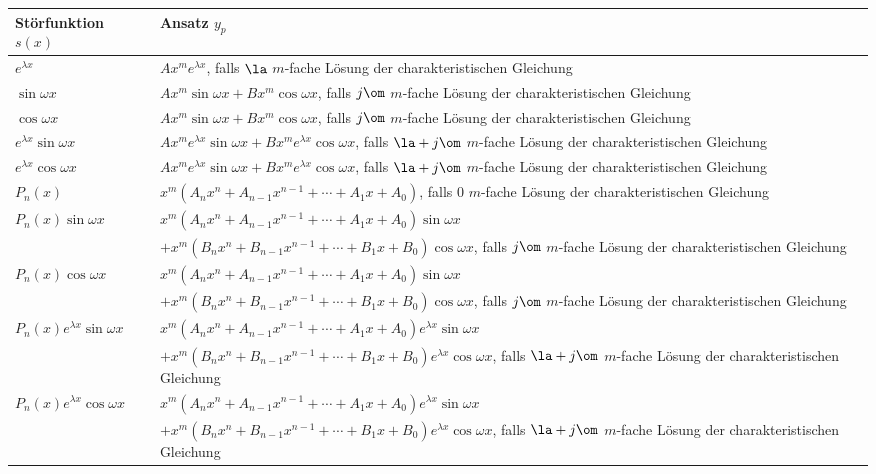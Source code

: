 

\def\arraystretch{1.5}
\noindent
\begin{longtable}{@{}p{}|p{}}
\hline
Störfunktion $s(x)$ & Ansatz $y_p$ \\
\hline
$e^{\lambda x}$ & 
$Ax^me^{\lambda x}$, falls $\la$ $m$-fache Lösung der charakteristischen 
Gleichung \\
$\sin \omega x$ & $Ax^m\sin \omega x+Bx^m\cos\omega x$, falls $j\om$ $m$-fache 
Lösung der charakteristischen Gleichung \\
$\cos \omega x$ & $Ax^m\sin \omega x+Bx^m\cos\omega x$, falls $j\om$ $m$-fache 
Lösung der charakteristischen Gleichung \\
$e^{\lambda x}\sin \omega x$ & $Ax^me^{\lambda x}\sin \omega 
x+Bx^me^{\lambda x}\cos\omega x$, falls $\la+j\om$ $m$-fache Lösung der 
charakteristischen Gleichung \\
$e^{\lambda x}\cos \omega x$ & $Ax^me^{\lambda x}\sin \omega 
x+Bx^me^{\lambda x}\cos\omega x$, falls $\la+j\om$ $m$-fache Lösung der 
charakteristischen Gleichung \\
$P_n(x)$ & $x^m(A_n x^{n}+A_{n-1} x^{n-1}+\cdots+A_1 x+A_0)$, 
falls $0$ $m$-fache Lösung der charakteristischen Gleichung \\
$P_n(x)\sin \omega x$ 
& $x^m(A_n x^n+A_{n-1} x^{n-1}+\cdots+A_1 x+A_0)\sin \omega x$ \\
 & \qquad$+x^m(B_n x^n+B_{n-1} x^{n-1}+\cdots+B_1 x+B_0)\cos\omega x$, 
 falls $j\om$ $m$-fache Lösung der charakteristischen Gleichung \\
$P_n(x)\cos \omega x$ 
& $x^m(A_n x^n+A_{n-1} x^{n-1}+\cdots+A_1 x+A_0)\sin \omega x$ \\
 & \qquad$+x^m(B_n x^n+B_{n-1} x^{n-1}+\cdots+B_1 x+B_0)\cos\omega x$, 
 falls $j\om$ $m$-fache Lösung der charakteristischen Gleichung \\
$P_n(x)e^{\lambda x}\sin \omega x$ 
& $x^m(A_n x^n+A_{n-1} x^{n-1}+\cdots+A_1 x+A_0)e^{\lambda x}\sin \omega x$ \\
 & \qquad$+x^m(B_n x^n+B_{n-1} x^{n-1}+\cdots+B_1 x+B_0)e^{\lambda x}\cos\omega 
 x$, falls $\la+j\om$ $m$-fache Lösung der charakteristischen Gleichung \\
$P_n(x)e^{\lambda x}\cos \omega x$ & $x^m(A_n x^n+A_{n-1} 
x^{n-1}+\cdots+A_1 x+A_0)e^{\lambda x}\sin \omega x$ \\
 & \qquad$+x^m(B_n x^n+B_{n-1} x^{n-1}+\cdots+B_1 x+B_0)e^{\lambda x}\cos\omega 
 x$, falls $\la+j\om$ $m$-fache Lösung der charakteristischen Gleichung \\
\end{longtable}

